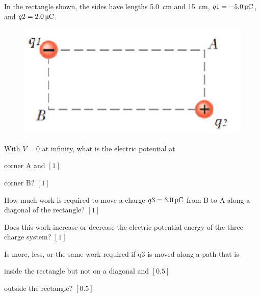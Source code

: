 \begin{problem}
    In the rectangle shown, the sides have lengths \qty{5.0}{\cm} and \qty{15}{\cm}, $q1 = \qty{-5.0}{\micro\C}$, and $q2 = \qty{+2.0}{\micro\C}$. 
    \begin{figure}[H]
        \centering
        \includegraphics{spho_book_TYS_images/2021SPhO_2.png}
    \end{figure}  
    With  $V = 0$ at infinity, what is the electric potential at
    \begin{subproblemalph}
        \item corner A and \hfill $[1]$
        \item corner B? \hfill $[1]$
        \item How much work is required to move a charge $q3 = \qty{+3.0}{\micro\C}$ from B to A along a diagonal of the rectangle? \hfill $[1]$
        \item Does this work increase or decrease the electric potential energy of the three-charge system? \hfill $[1]$
    \end{subproblemalph}
    Is more, less, or the same work required if q3 is moved along a path that is
    \begin{subproblemalph}
        \setcounter{enumi}{4}
        \item inside the rectangle but not on a diagonal and \hfill $[0.5]$        
        \item outside the rectangle?  \hfill $[0.5]$
    \end{subproblemalph}
\end{problem}

